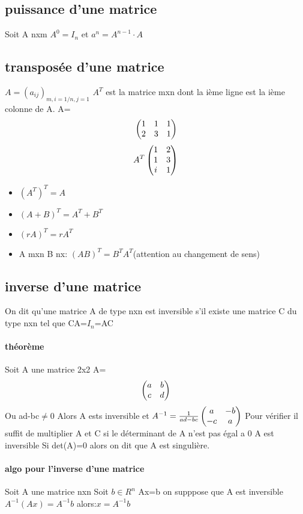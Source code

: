 \documentclass[a4paper,10pt]{article}
\begin{document}
 \subsection{puissance d'une matrice}
 Soit A nxm $A^0=I_n$ et $a^n=A^{n-1}\cdot A$
 \subsection{transposée d'une matrice}
 $A=(a_{ij})_{m,i=1/n,j=1}$ $A^T$ est la matrice mxn dont la ième ligne est la ième colonne de A. 
\newline
A=
 \[
\begin{pmatrix}
1&1&1\cr
2&3&1\cr
\end{pmatrix}
\]
\[A^T
\begin{pmatrix}
1&2\cr
1&3\cr
i&1\cr
\end{pmatrix}
\]
\begin{itemize}
 \item $(A^T)^T=A$
 \item $(A+B)^T=A^T+B^T$
 \item $(rA)^T=rA^T$
 \item A mxn  B nx: $(AB)^T=B^TA^T$(attention au changement de sens)
\end{itemize}
\subsection{inverse d'une matrice}
On dit qu'une matrice A de type nxn est inversible s'il existe une matrice C du type nxn tel que CA=$I_n$=AC
\paragraph{théorème}
Soit A une matrice 
2x2 A=
\[
\begin{pmatrix}
a&b\cr
c&d\cr
\end{pmatrix}
\]
\newline
Ou ad-bc$\neq$0
\newline
Alors A ests inversible et $A^{-1}=\frac{1}{ad-bc}
\begin{pmatrix}
a&-b\cr
-c&a\cr
\end{pmatrix}
$
\newline
Pour vérifier il suffit de multiplier A et C
\newline
si le déterminant de A n'est pas égal a 0 A est inversible
\newline
Si det(A)=0 alors on dit que A est singulière.
\paragraph{algo pour l'inverse d'une matrice}
Soit A une matrice nxn
\newline
Soit $b\in R^n$
\newline
Ax=b on supppose que A est inversible $A^{-1}(Ax)=A^{-1}b$ alors:$x=A^{-1}b$
\end{document}

